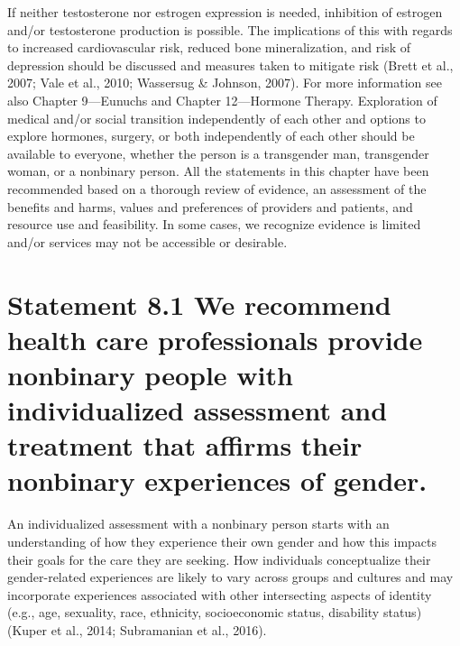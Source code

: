 \documentclass[
]{book}
\begin{document}
If neither testosterone nor estrogen expression is
needed, inhibition of estrogen and/or testosterone
production is possible. The implications of this with
regards to increased cardiovascular risk, reduced
bone mineralization, and risk of depression should
be discussed and measures taken to mitigate risk
(Brett et al., 2007; Vale et al., 2010; Wassersug \&
Johnson, 2007). For more information see also
Chapter 9---Eunuchs and Chapter 12---Hormone
Therapy. Exploration of medical and/or social transition independently of each other and options to
explore hormones, surgery, or both independently
of each other should be available to everyone,
whether the person is a transgender man, transgender woman, or a nonbinary person.
All the statements in this chapter have been
recommended based on a thorough review of
evidence, an assessment of the benefits and
harms, values and preferences of providers and
patients, and resource use and feasibility. In some
cases, we recognize evidence is limited and/or
services may not be accessible or desirable.

\hypertarget{statement-8.1-we-recommend-health-care-professionals-provide-nonbinary-people-with-individualized-assessment-and-treatment-that-affirms-their-nonbinary-experiences-of-gender.}{%
\section*{Statement 8.1 We recommend health care professionals provide nonbinary people with individualized assessment and treatment that affirms their nonbinary experiences of gender.}\label{statement-8.1-we-recommend-health-care-professionals-provide-nonbinary-people-with-individualized-assessment-and-treatment-that-affirms-their-nonbinary-experiences-of-gender.}}

An individualized assessment with a nonbinary
person starts with an understanding of how they
experience their own gender and how this impacts
their goals for the care they are seeking. How
individuals conceptualize their gender-related
experiences are likely to vary across groups and
cultures and may incorporate experiences associated with other intersecting aspects of identity
(e.g., age, sexuality, race, ethnicity, socioeconomic
status, disability status) (Kuper et al., 2014;
Subramanian et al., 2016).
\end{document}
